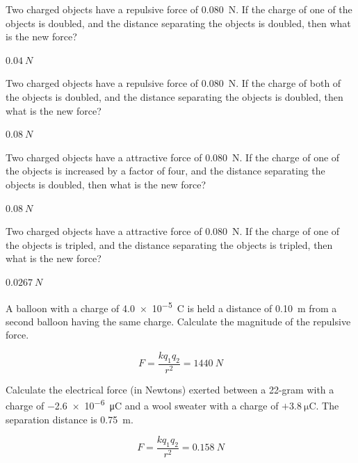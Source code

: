 \documentclass[answers]{exam}
\begin{document}
\begin{questions}
\question
Two charged objects have a repulsive force of \SI{0.080}{N}. If the charge of one of the objects is doubled, and the distance separating the objects is doubled, then what is the new force?

\begin{solution}
$\SI{0.04}{N}$
\end{solution}


\question
Two charged objects have a repulsive force of \SI{0.080}{N}. If the charge of both of the objects is doubled, and the distance separating the objects is doubled, then what is the new force?

\begin{solution}
$\SI{0.08}{N}$
\end{solution}

\question
Two charged objects have a attractive force of \SI{0.080}{N}. If the charge of one of the objects is increased by a factor of four, and the distance separating the objects is doubled, then what is the new force?

\begin{solution}
$\SI{0.08}{N}$
\end{solution}

\question
Two charged objects have a attractive force of \SI{0.080}{N}. If the charge of one of the objects is tripled, and the distance separating the objects is tripled, then what is the new force?

\begin{solution}
$\SI{0.0267}{N}$
\end{solution}








\question
A balloon with a charge of \SI{4.0e-5}{C} is held a distance of \SI{0.10}{m} from a second balloon having the same charge. Calculate the magnitude of the repulsive force.

\begin{solution}
\begin{equation*}
    F = \frac{kq_1q_2}{r^2} = \SI{1440}{N}
\end{equation*}
\end{solution}

\question
Calculate the electrical force (in Newtons) exerted between a 22-gram with a charge of \SI{-2.6e-6}{\micro\coulomb} and a wool sweater with a charge of $+\SI{3.8}{\micro\coulomb}$. The separation distance is \SI{0.75}{m}.

\begin{solution}
\begin{equation*}
    F = \frac{k q_1 q_2}{r^2} = \SI{0.158}{N}
\end{equation*}
\end{solution}


\end{questions}
\end{document}

